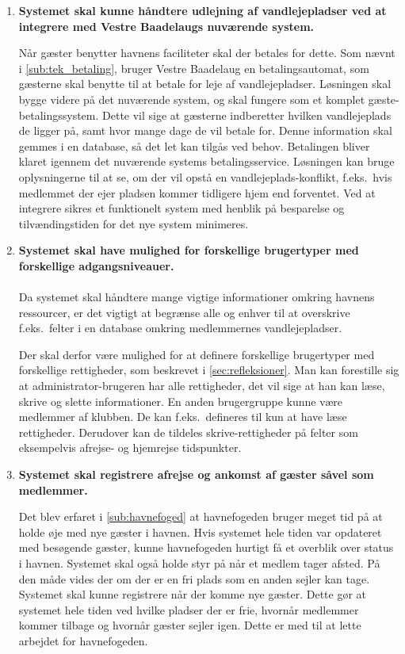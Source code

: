 \begin{enumerate}
	\item \label{itm:udlejning} \textbf{ Systemet skal kunne håndtere udlejning af vandlejepladser ved at integrere med Vestre Baadelaugs nuværende system. }

Når gæster benytter havnens faciliteter skal der betales for dette. Som nævnt i \cref{sub:tek_betaling}, bruger Vestre Baadelaug en betalingsautomat, som gæsterne skal benytte til at betale for leje af vandlejepladser. Løsningen skal bygge videre på det nuværende system, og skal fungere som et komplet gæste-betalingssystem. Dette vil sige at gæsterne indberetter hvilken vandlejeplads de ligger på, samt hvor mange dage de vil betale for. Denne information skal gemmes i en database, så det let kan tilgås ved behov. Betalingen bliver klaret igennem det nuværende systems betalingsservice. Løsningen kan bruge oplysningerne til at se, om der vil opstå en vandlejeplads-konflikt, f.eks.\ hvis medlemmet der ejer pladsen kommer tidligere hjem end forventet. Ved at integrere sikres et funktionelt system med henblik på besparelse og tilvændingstiden for det nye system minimeres.

	\item \label{itm:brugergrupper} \textbf{ Systemet skal have mulighed for forskellige brugertyper med forskellige adgangsniveauer.} \\\\
  Da systemet skal håndtere mange vigtige informationer omkring havnens ressourcer, er det vigtigt at begrænse alle og enhver til at overskrive f.eks.\ felter i en database omkring medlemmernes vandlejepladser.

  Der skal derfor være mulighed for at definere forskellige brugertyper med forskellige rettigheder, som beskrevet i \cref{sec:refleksioner}. Man kan forestille sig at administrator-brugeren har alle rettigheder, det vil sige at han kan læse, skrive og slette informationer. En anden brugergruppe kunne være medlemmer af klubben. De kan f.eks.\ defineres til kun at have læse rettigheder. Derudover kan de tildeles skrive-rettigheder på felter som eksempelvis afrejse- og hjemrejse tidspunkter.

\item \label{itm:reg_an_afkomst} \textbf{Systemet skal registrere afrejse og ankomst af gæster såvel som medlemmer.} 

  Det blev erfaret i \cref{sub:havnefoged} at havnefogeden bruger meget tid på at holde øje med nye gæster i havnen. Hvis systemet hele tiden var opdateret med besøgende gæster, kunne havnefogeden hurtigt få et overblik over status i havnen. Systemet skal også holde styr på når et medlem tager afsted. På den måde vides der om der er en fri plads som en anden sejler kan tage. Systemet skal kunne registrere når der komme nye gæster. Dette gør at systemet hele tiden ved hvilke pladser der er frie, hvornår medlemmer kommer tilbage og hvornår gæster sejler igen. Dette er med til at lette arbejdet for havnefogeden.


\end{enumerate}

